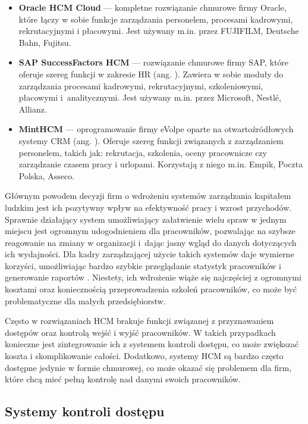 \begin{itemize}
    \item \textbf{Oracle HCM Cloud} \cite{bib:OracleHCM} --- kompletne rozwiązanie chmurowe firmy Oracle, które łączy w sobie funkcje zarządzania personelem, procesami kadrowymi, rekrutacyjnymi i płacowymi. Jest używany m.in. przez FUJIFILM, Deutsche Bahn, Fujitsu.
    \item \textbf{SAP SuccessFactors HCM} \cite{bib:SAPHCM} --- rozwiązanie chmurowe firmy SAP, które oferuje szereg funkcji w zakresie HR (ang. ). Zawiera w sobie moduły do zarządzania procesami kadrowymi, rekrutacyjnymi, szkoleniowymi, płacowymi i~analitycznymi. Jest używany m.in. przez Microsoft, Nestlé, Allianz.
    \item \textbf{MintHCM} \cite{bib:MintHCM} --- oprogramowanie firmy eVolpe oparte na otwartoźródłowych systemy CRM (ang. ). Oferuje szereg funkcji związanych z zarządzaniem personelem, takich jak: rekrutacja, szkolenia, oceny pracownicze czy zarządzanie czasem pracy i urlopami.  Korzystają z niego m.in. Empik, Poczta Polska, Asseco.
\end{itemize}

Głównym powodem decyzji firm o wdrożeniu systemów zarządzania kapitałem ludzkim jest ich pozytywny wpływ na efektywność pracy i wzrost przychodów. Sprawnie działający system umożliwiający załatwienie wielu spraw w jednym miejscu jest ogromnym udogodnieniem dla pracowników, pozwalając na szybsze reagowanie na zmiany w organizacji i~dając jasny wgląd do danych dotyczących ich wydajności. Dla kadry zarządzającej użycie takich systemów daje wymierne korzyści, umożliwiając bardzo szybkie przeglądanie statystyk pracowników i generowanie raportów \cite{bib:ZarzadzanieZasobamiLudzkimi}. Niestety, ich wdrożenie wiąże się najczęściej z ogromnymi kosztami oraz koniecznością przeprowadzenia szkoleń pracowników, co może być problematyczne dla małych przedsiębiorstw.

Często w rozwiązaniach HCM brakuje funkcji związanej z przyznawaniem dostępów oraz kontrolą wejść i wyjść pracowników. W takich przypadkach konieczne jest zintegrowanie ich z systemem kontroli dostępu, co może zwiększać koszta i skomplikowanie całości. Dodatkowo, systemy HCM są bardzo często dostępne jedynie w formie chmurowej, co może okazać się problemem dla firm, które chcą mieć pełną kontrolę nad danymi swoich pracowników.

\subsection{Systemy kontroli dostępu}

